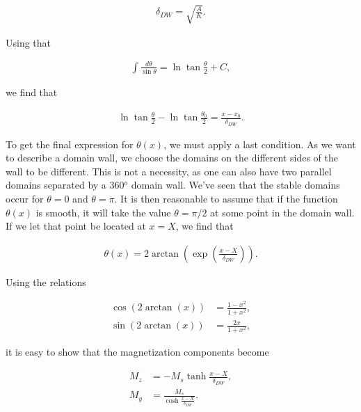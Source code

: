 \documentclass[1p]{elsarticle}		%
\numberwithin{equation}{section}
\begin{document}
\begin{align}
\delta_{DW} = \sqrt{\frac{A}{K}}.
\end{align}

Using that

\begin{align*}
\int \frac{d\theta}{\sin\theta} = \ln \tan\frac{\theta}{2} + C,
\end{align*}

we find that

\begin{align}
\ln \tan\frac{\theta}{2} - \ln \tan\frac{\theta_0}{2} = \frac{x-x_0}{\delta_{DW}}.
\end{align}

To get the final expression for $\theta(x)$, we must apply a last condition. As we want to describe a domain wall, we choose the domains on the different sides of the wall to be different. This is not a necessity, as one can also have two parallel domains separated by a 360$^o$ domain wall. We've seen that the stable domains occur for $\theta = 0$ and $\theta = \pi$. It is then reasonable to assume that if the function $\theta (x)$ is smooth, it will take the value $\theta = \pi/2$ at some point in the domain wall. If we let that point be located at $x = X$, we find that

\begin{align}
\label{eq:thetaBloch}
\theta(x) = 2\arctan(\exp(\frac{x-X}{\delta_{DW}})).
\end{align}

Using the relations

\begin{align*}
\cos(2\arctan(x)) &= \frac{1-x^2}{1+x^2}, \\
\sin(2\arctan(x)) &= \frac{2x}{1+x^2},
\end{align*}

it is easy to show that the magnetization components become

\begin{align}
M_z &= - M_s\tanh\frac{x-X}{\delta_{DW}}, \label{eq:BlochMagZ} \\
M_y &= \frac{M_s}{\cosh\frac{x-X}{\delta_{DW}}}.
\end{align}
\end{document}
